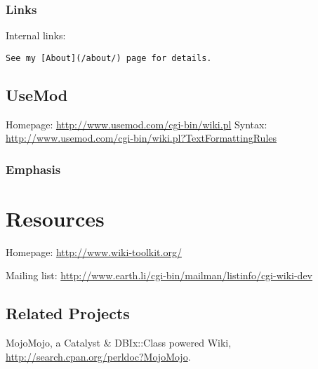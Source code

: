 
\subsubsection{Links}
Internal links:

\begin{verbatim}
See my [About](/about/) page for details.
\end{verbatim}

\subsection{UseMod}
Homepage: \url{http://www.usemod.com/cgi-bin/wiki.pl}
Syntax: \url{http://www.usemod.com/cgi-bin/wiki.pl?TextFormattingRules}

\subsubsection{Emphasis}

\section{Resources}

Homepage: \url{http://www.wiki-toolkit.org/}

Mailing list: \url{http://www.earth.li/cgi-bin/mailman/listinfo/cgi-wiki-dev}

\subsection{Related Projects}
MojoMojo, a Catalyst \& DBIx::Class powered Wiki,
\url{http://search.cpan.org/perldoc?MojoMojo}.


    
